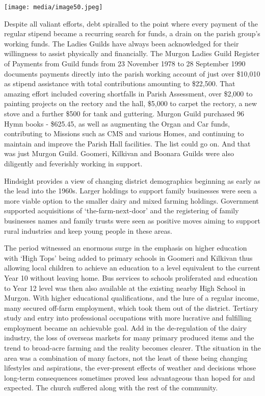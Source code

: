 \texttt{[image: media/image50.jpeg]}

Despite all valiant efforts, debt spiralled to the point where every payment of the regular stipend became a recurring search for funds, a drain on the parish group's working funds. The Ladies Guilds have always been acknowledged for their willingness to assist physically and financially. The Murgon Ladies Guild Register of Payments from Guild funds from 23 November 1978 to 28 September 1990 documents payments directly into the parish working account of just over \$10,010 as stipend assistance with total contributions amounting to \$22,500. That amazing effort included covering shortfalls in Parish Assessment, over \$2,000 to painting projects on the rectory and the hall, \$5,000 to carpet the rectory, a new stove and a further \$500 for tank and guttering. Murgon Guild purchased 96 Hymn books - \$625.45, as well as augmenting the Organ and Car funds, contributing to Missions such as CMS and various Homes, and continuing to maintain and improve the Parish Hall facilities. The list could go on. And that was just Murgon Guild. Goomeri, Kilkivan and Boonara Guilds were also diligently and feverishly working in support.

Hindsight provides a view of changing district demographics beginning as early as the lead into the 1960s. Larger holdings to support family businesses were seen a more viable option to the smaller dairy and mixed farming holdings. Government supported acquisitions of `the-farm-next-door' and the registering of family businesses names and family trusts were seen as positive moves aiming to support rural industries and keep young people in these areas.

The period witnessed an enormous surge in the emphasis on higher education with `High Tops' being added to primary schools in Goomeri and Kilkivan thus allowing local children to achieve an education to a level equivalent to the current Year 10 without leaving home. Bus services to schools proliferated and education to Year 12 level was then also available at the existing nearby High School in Murgon. With higher educational qualifications, and the lure of a regular income, many secured off-farm employment, which took them out of the district. Tertiary study and entry into professional occupations with more lucrative and fulfilling employment became an achievable goal. Add in the de-regulation of the dairy industry, the loss of overseas markets for many primary produced items and the trend to broad-acre farming and the reality becomes clearer. Tthe situation in the area was a combination of many factors, not the least of these being changing lifestyles and aspirations, the ever-present effects of weather and decisions whose long-term consequences sometimes proved less advantageous than hoped for and expected. The church suffered along with the rest of the community.


